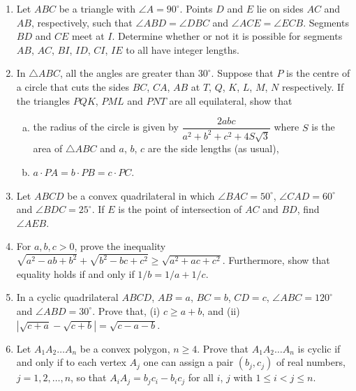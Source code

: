 \documentclass[12pt]{scrartcl}
\begin{document}
\begin{enumerate}[label=P\arabic*.,leftmargin=*,itemsep=0.6em]
\item Let $ABC$ be a triangle with $\angle A = 90^\circ$. Points $D$ and $E$ lie on sides $AC$ and $AB$, respectively, such that $\angle ABD = \angle DBC$ and $\angle ACE = \angle ECB$. Segments $BD$ and $CE$ meet at $I$. Determine whether or not it is possible for segments $AB$, $AC$, $BI$, $ID$, $CI$, $IE$ to all have integer lengths.

\item In $\triangle ABC$, all the angles are greater than $30^\circ$. Suppose that $P$ is the centre of a circle that cuts the sides $BC$, $CA$, $AB$ at $T$, $Q$, $K$, $L$, $M$, $N$ respectively. If the triangles $PQK$, $PML$ and $PNT$ are all equilateral, show that
\begin{enumerate}[(a)]
\item the radius of the circle is given by $\dfrac{2abc}{a^2+b^2+c^2+4S\sqrt{3}}$ where $S$ is the area of $\triangle ABC$ and $a$, $b$, $c$ are the side lengths (as usual),
\item $a \cdot PA = b \cdot PB = c \cdot PC$.
\end{enumerate}

\item Let $ABCD$ be a convex quadrilateral in which $\angle BAC = 50^\circ$, $\angle CAD = 60^\circ$ and $\angle BDC = 25^\circ$. If $E$ is the point of intersection of $AC$ and $BD$, find $\angle AEB$.

\item For $a, b, c > 0$, prove the inequality $\sqrt{a^2-ab+b^2} + \sqrt{b^2-bc+c^2} \ge \sqrt{a^2+ac+c^2}$. Furthermore, show that equality holds if and only if $1/b = 1/a + 1/c$.

\item In a cyclic quadrilateral $ABCD$, $AB = a$, $BC = b$, $CD = c$, $\angle ABC = 120^\circ$ and $\angle ABD = 30^\circ$. Prove that, (i) $c \ge a + b$, and (ii) $|\sqrt{c+a} - \sqrt{c+b}| = \sqrt{c-a-b}$.

\item Let $A_1A_2\ldots A_n$ be a convex polygon, $n \ge 4$. Prove that $A_1A_2\ldots A_n$ is cyclic if and only if to each vertex $A_j$ one can assign a pair $(b_j, c_j)$ of real numbers, $j = 1, 2, \ldots, n$, so that $A_iA_j = b_jc_i - b_ic_j$ for all $i$, $j$ with $1 \le i < j \le n$.


\end{enumerate}
\end{document}
